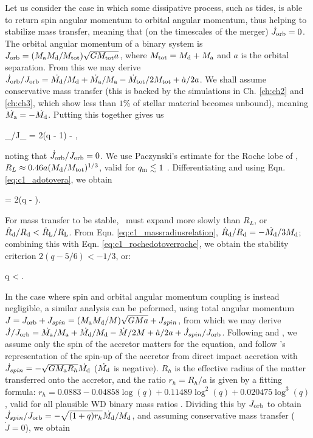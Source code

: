 Let us consider the case in which some dissipative process, such as tides, is able to return spin angular momentum to orbital angular momentum, thus helping to stabilize mass transfer, meaning that (on the timescales of the merger) $\dot{J}_\mathrm{orb} = 0$.  The orbital angular momentum of a binary system is $J_\mrm{orb} = (\Ma\Md/\Mtot)\sqrt{G\Mtot a}$, where $\Mtot = \Md + \Ma$ and $a$ is the orbital separation.  From this we may derive $\dot{J}_\mrm{orb}/J_\mrm{orb} = \dot{\Md}/\Md + \dot{\Ma}/\Ma - \dot{M}_\mrm{tot}/2\Mtot + \dot{a}/2a$.  We shall assume conservative mass transfer (this is backed by the simulations in Ch. \ref{ch:ch2} and \ref{ch:ch3}, which show less than $1$\% of stellar material becomes unbound), meaning $\dot{\Ma} = -\dot{\Md}$.  Putting this together gives us

\eqbegin
{}_/J_ = 2(q - 1)\frac{\dot{\Md}}{\Md} - ,
\label{eq:c1_adotovera}
\eqend

\noindent noting that $\dot{J}_\mathrm{orb}/J_\mathrm{orb} = 0$.  We use Paczynski's estimate for the Roche lobe of \Md, $R_L \approx 0.46a(\Md/\Mtot)^{1/3}$, valid for $\qm \lesssim 1$ \citep{eggl83}.  Differentiating and using Eqn. \ref{eq:c1_adotovera}, we obtain

\eqbegin
{} = 2(q - )\frac{\dot{\Md}}{\Md}.
\label{eq:c1_rochedotoverroche}
\eqend

\noindent For mass transfer to be stable, \Rd\ must expand more slowly than $R_L$, or $\dot{R}_\mrm{d}/\Rd < \dot{R}_\mrm{L}/R_\mrm{L}$.  From Eqn. \ref{eq:c1_massradiusrelation}, $\dot{R}_\mrm{d}/\Rd = -\dot{\Md}/3\Md$; combining this with Eqn. \ref{eq:c1_rochedotoverroche}, we obtain the stability criterion $2(q - 5/6) < -1/3$, or:

\eqbegin
q < .
\label{eq:c1_qcrit}
\eqend

In the case where spin and orbital angular momentum coupling is instead negligible, a similar analysis can be peformed, using total angular momentum $J = J_\mrm{orb} + J_{spin} = (\Ma\Md/M)\sqrt{GMa} + J_{spin}$, from which we may derive $\dot{J}/J_\mrm{orb} = \dot{\Ma}/\Ma + \dot{\Md}/\Md - \dot{M}/2M + \dot{a}/2a + \dot{J}_{spin}/J_\mrm{orb}$.  Following \cite{marsns04} and \cite{nele+01}, we assume only the spin of the accretor matters for the equation, and follow \cite{verbr88}'s representation of the spin-up of the accretor from direct impact accretion with $\dot{J}_{spin} = -\sqrt{G\Ma R_h}\dot{\Md}$ ($\dot{\Md}$ is negative).  $R_h$ is the effective radius of the matter transferred onto the accretor, and the ratio $r_h = R_h/a$ is given by a fitting formula: $r_h = 0.0883 - 0.04858\log({q}) + 0.11489{\log}^2(q) + 0.020475{\log}^3(q)$, valid for all plausible WD binary mass ratios \citep{verbr88}.  Dividing this by $J_\mathrm{orb}$ to obtain $\dot{J}_{spin}/J_\mrm{orb} = -\sqrt{(1 + q)r_h}\dot{\Md}/\Md$, and assuming conservative mass transfer ($\dot{J} = 0$), we obtain \citep{marsns04,nele+01}

